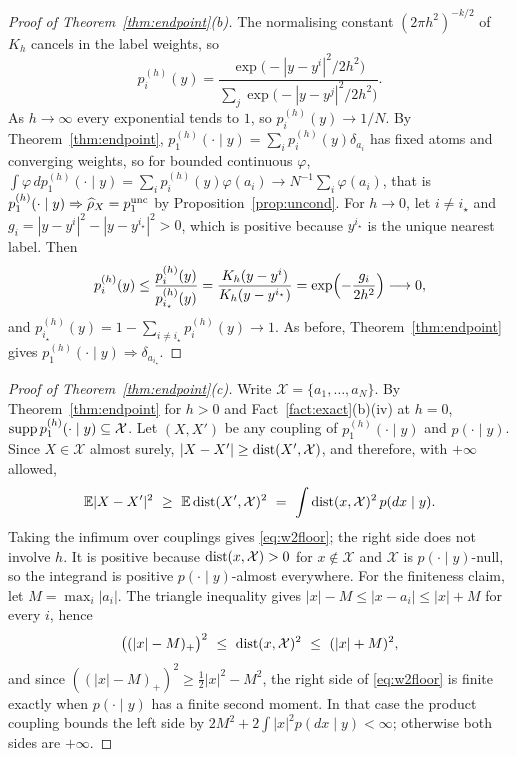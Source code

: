 \documentclass{article} %
\theoremstyle{plain}
\theoremstyle{definition}
\theoremstyle{remark}
\begin{document}
\label{apx:pf-zerobw}
\begin{proof}[Proof of Theorem~\ref{thm:endpoint}(b)]
The normalising constant $(2\pi h^2)^{-k/2}$ of $K_h$ cancels in the label weights, so
\[
p_i^{(h)}(y)=\frac{\exp\bigl(-|y-y^i|^2/2h^2\bigr)}{\sum_j\exp\bigl(-|y-y^j|^2/2h^2\bigr)} .
\]
As $h\to\infty$ every exponential tends to $1$, so $p_i^{(h)}(y)\to1/N$. By
Theorem~\ref{thm:endpoint}, $p_1^{(h)}(\cdot\mid y)=\sum_ip_i^{(h)}(y)\delta_{a_i}$ has fixed atoms
and converging weights, so for bounded continuous $\varphi$,
$\int\varphi\,dp_1^{(h)}(\cdot\mid y)=\sum_ip_i^{(h)}(y)\varphi(a_i)\to N^{-1}\sum_i\varphi(a_i)$,
that is $p_1^{(h)}(\cdot\mid y)\Rightarrow\widehat{\rho}_X=p_1^{\mathrm{unc}}$ by
Proposition~\ref{prop:uncond}. For $h\to0$, let $i\ne i_\star$ and
$g_i=|y-y^i|^2-|y-y^{i_\star}|^2>0$, which is positive because $y^{i_\star}$ is the unique nearest
label. Then
\[
p_i^{(h)}(y)\le\frac{p_i^{(h)}(y)}{p_{i_\star}^{(h)}(y)}
=\frac{K_h(y-y^i)}{K_h(y-y^{i_\star})}=\exp\Bigl(-\frac{g_i}{2h^2}\Bigr)\longrightarrow0,
\]
and $p_{i_\star}^{(h)}(y)=1-\sum_{i\ne i_\star}p_i^{(h)}(y)\to1$. As before,
Theorem~\ref{thm:endpoint} gives $p_1^{(h)}(\cdot\mid y)\Rightarrow\delta_{a_{i_\star}}$.
\end{proof}

\label{apx:pf-atomicity}
\begin{proof}[Proof of Theorem~\ref{thm:endpoint}(c)]
Write $\mathcal X=\{a_1,\dots,a_N\}$. By Theorem~\ref{thm:endpoint} for $h>0$ and
Fact~\ref{fact:exact}(b)(iv) at $h=0$, $\operatorname{supp} p_1^{(h)}(\cdot\mid y)\subseteq\mathcal X$. Let
$(X,X')$ be any coupling of $p_1^{(h)}(\cdot\mid y)$ and $p(\cdot\mid y)$. Since $X\in\mathcal X$
almost surely, $|X-X'|\ge\operatorname{dist}(X',\mathcal X)$, and therefore, with $+\infty$ allowed,
\[
\E|X-X'|^2\ \ge\ \E\dist(X',\mathcal X)^2\ =\ \int\dist(x,\mathcal X)^2\,p(dx\mid y).
\]
Taking the infimum over couplings gives \eqref{eq:w2floor}; the right side does not involve $h$.
It is positive because $\operatorname{dist}(x,\mathcal X)>0$ for $x\notin\mathcal X$ and $\mathcal X$ is
$p(\cdot\mid y)$-null, so the integrand is positive $p(\cdot\mid y)$-almost everywhere. For the
finiteness claim, let $M=\max_i|a_i|$. The triangle inequality gives
$|x|-M\le|x-a_i|\le|x|+M$ for every $i$, hence
\[
\bigl((|x|-M)_+\bigr)^2\ \le\ \dist(x,\mathcal X)^2\ \le\ (|x|+M)^2 ,
\]
and since $((|x|-M)_+)^2\ge\tfrac12|x|^2-M^2$, the right side of \eqref{eq:w2floor} is finite exactly
when $p(\cdot\mid y)$ has a finite second moment. In that case the product coupling bounds the left
side by $2M^2+2\int|x|^2p(dx\mid y)<\infty$; otherwise both sides are $+\infty$.
\end{proof}
\end{document}
